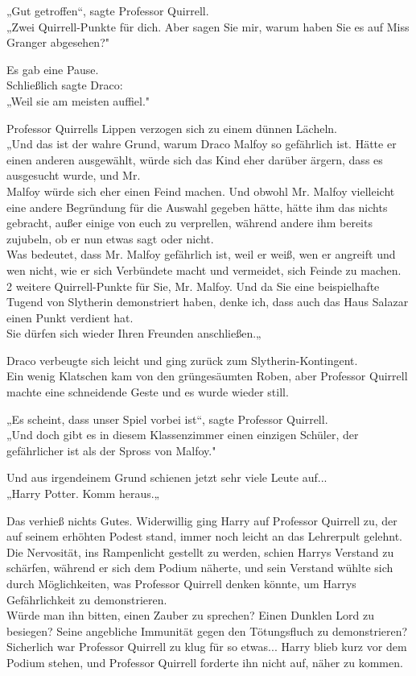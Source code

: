 {„Gut getroffen“, sagte Professor Quirrell.\\ „Zwei Quirrell-Punkte für dich. Aber sagen Sie mir, warum haben Sie es auf Miss Granger abgesehen?"

Es gab eine Pause.\\ Schließlich sagte Draco:\\ „Weil sie am meisten auffiel."

Professor Quirrells Lippen verzogen sich zu einem dünnen Lächeln.\\ „Und das ist der wahre Grund, warum Draco Malfoy so gefährlich ist. Hätte er einen anderen ausgewählt, würde sich das Kind eher darüber ärgern, dass es ausgesucht wurde, und Mr.\\ Malfoy würde sich eher einen Feind machen. Und obwohl Mr. Malfoy vielleicht eine andere Begründung für die Auswahl gegeben hätte, hätte ihm das nichts gebracht, außer einige von euch zu verprellen, während andere ihm bereits zujubeln, ob er nun etwas sagt oder nicht.\\ Was bedeutet, dass Mr. Malfoy gefährlich ist, weil er weiß, wen er angreift und wen nicht, wie er sich Verbündete macht und vermeidet, sich Feinde zu machen.\\ 2 weitere Quirrell-Punkte für Sie, Mr. Malfoy. Und da Sie eine beispielhafte Tugend von Slytherin demonstriert haben, denke ich, dass auch das Haus Salazar einen Punkt verdient hat.\\ Sie dürfen sich wieder Ihren Freunden anschließen.„

Draco verbeugte sich leicht und ging zurück zum Slytherin-Kontingent.\\ Ein wenig Klatschen kam von den grüngesäumten Roben, aber Professor Quirrell machte eine schneidende Geste und es wurde wieder still.

„Es scheint, dass unser Spiel vorbei ist“, sagte Professor Quirrell.\\ „Und doch gibt es in diesem Klassenzimmer einen einzigen Schüler, der gefährlicher ist als der Spross von Malfoy."

Und aus irgendeinem Grund schienen jetzt sehr viele Leute auf...\\ „Harry Potter. Komm heraus.„

Das verhieß nichts Gutes. Widerwillig ging Harry auf Professor Quirrell zu, der auf seinem erhöhten Podest stand, immer noch leicht an das Lehrerpult gelehnt.\\ Die Nervosität, ins Rampenlicht gestellt zu werden, schien Harrys Verstand zu schärfen, während er sich dem Podium näherte, und sein Verstand wühlte sich durch Möglichkeiten, was Professor Quirrell denken könnte, um Harrys Gefährlichkeit zu demonstrieren.\\ Würde man ihn bitten, einen Zauber zu sprechen? Einen Dunklen Lord zu besiegen? Seine angebliche Immunität gegen den Tötungsfluch zu demonstrieren? Sicherlich war Professor Quirrell zu klug für so etwas... Harry blieb kurz vor dem Podium stehen, und Professor Quirrell forderte ihn nicht auf, näher zu kommen.

}
